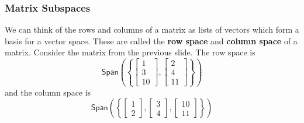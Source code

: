 \documentclass[10pt]{beamer}
\begin{document}
\begin{frame}
  \frametitle{Matrix Subspaces}
  We can think of the rows and columns of a matrix as lists of vectors which form a basis for a vector space. These are called the \textbf{row space} and \textbf{column space} of a matrix. Consider the matrix from the previous slide. The row space is
  $$\mathsf{Span}\left(\left\{\left[\begin{matrix}
      1\\
      3\\
      10
    \end{matrix}\right], \left[\begin{matrix}
      2\\
      4\\
      11
    \end{matrix}\right]\right\}\right)$$
  and the column space is
  $$\mathsf{Span}\left(\left\{\left[\begin{matrix}
      1\\
      2
    \end{matrix}\right], \left[\begin{matrix}
      3\\
      4
    \end{matrix}\right], \left[\begin{matrix}
      10\\
      11
    \end{matrix}\right]\right\}\right)$$
\end{frame}
\end{document}
